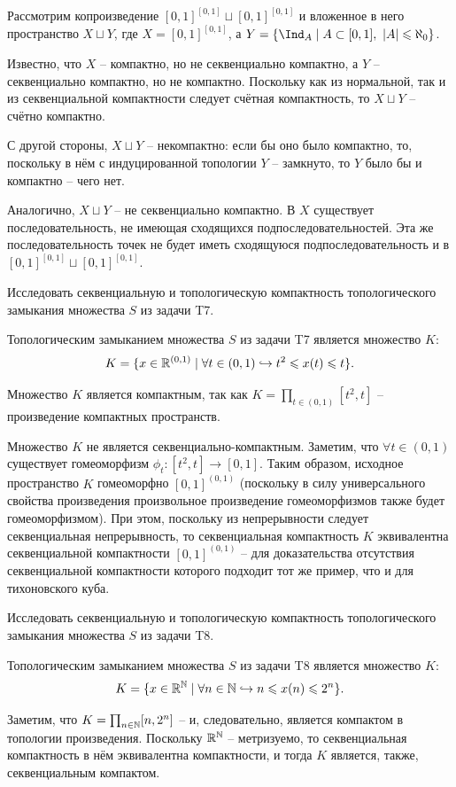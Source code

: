 \begin{solve}
    Рассмотрим копроизведение $[0, 1]^{[0, 1]} \sqcup [0, 1]^{[0, 1]}$ и вложенное в него пространство $X \sqcup Y$, где $X = [0, 1]^{[0, 1]}$, а $Y = \{\Ind_{A} \mid A \subset [0, 1], \ |A| \leq \aleph_0\}$.

    Известно, что $X$ -- компактно, но не секвенциально компактно, а $Y$ -- секвенциально компактно, но не компактно. Поскольку как из нормальной, так и из секвенциальной компактности следует счётная компактность, то $X \sqcup Y$ -- счётно компактно.

    С другой стороны, $X \sqcup Y$ -- некомпактно: если бы оно было компактно, то, поскольку в нём с индуцированной топологии $Y$ -- замкнуто, то $Y$ было бы и компактно -- чего нет.

    Аналогично, $X \sqcup Y$ -- не секвенциально компактно. В $X$ существует последовательность, не имеющая сходящихся подпоследовательностей. Эта же последовательность точек не будет иметь сходящуюся подпоследовательность и в $[0, 1]^{[0, 1]} \sqcup [0, 1]^{[0, 1]}$.
\end{solve}
\begin{task}[T8]
    Исследовать секвенциальную и топологическую компактность топологического замыкания множества $S$ из задачи T7.
\end{task}
\begin{solve}
    Топологическим замыканием множества $S$ из задачи T7 является множество $K\colon$
    \[
        K = \{x \in \mathbb{R}^{(0, 1)} \mid \forall t \in (0, 1) \hookrightarrow t^2 \leqslant x(t) \leqslant t\}.
    \]

    Множество $K$ является компактным, так как $K = \prod_{t \in (0, 1)} [t^2, t]$ -- произведение компактных пространств.

    Множество $K$ не является секвенциально-компактным. Заметим, что $\forall t \in (0, 1)$ существует гомеоморфизм $\phi_t\colon [t^2, t] \to [0, 1]$. Таким образом, исходное пространство $K$ гомеоморфно $[0, 1]^{(0, 1)}$ (поскольку в силу универсального свойства произведения произвольное произведение гомеоморфизмов также будет гомеоморфизмом). При этом, поскольку из непрерывности следует секвенциальная непрерывность, то секвенциальная компактность $K$ эквивалентна секвенциальной компактности $[0, 1]^{(0, 1)}$ -- для доказательства отсутствия секвенциальной компактности которого подходит тот же пример, что и для тихоновского куба.
\end{solve}
\begin{task}[T9]
    Исследовать секвенциальную и топологическую компактность топологического замыкания множества $S$ из задачи T8.
\end{task}
\begin{solve}
    Топологическим замыканием множества $S$ из задачи T8 является множество $K\colon$
    \[
        K = \{x \in \mathbb{R}^{\mathbb{N}} \mid  \forall n \in \mathbb{N} \hookrightarrow n \leqslant x(n) \leqslant 2^n\}.
    \]

    Заметим, что $K = \prod_{n \in \mathbb{N}} [n, 2^n]$ -- и, следовательно, является компактом в топологии произведения. Поскольку $\mathbb{R}^{\mathbb{N}}$ -- метризуемо, то секвенциальная компактность в нём эквивалентна компактности, и тогда $K$ является, также, секвенциальным компактом.
\end{solve}
